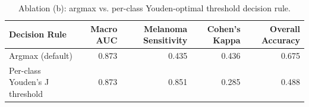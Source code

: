 \begin{table}
\caption{Ablation (b): argmax vs. per-class Youden-optimal threshold decision rule.}
\label{tab:table4b_decision_rule}
\begin{tabular}{lrrrr}
\toprule
Decision Rule & Macro AUC & Melanoma Sensitivity & Cohen's Kappa & Overall Accuracy \\
\midrule
Argmax (default) & 0.873 & 0.435 & 0.436 & 0.675 \\
Per-class Youden's J threshold & 0.873 & 0.851 & 0.285 & 0.488 \\
\bottomrule
\end{tabular}
\end{table}
